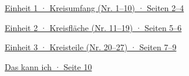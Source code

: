 \documentclass[11pt]{article}
\newcommand{\vzeile}[2]{\par\noindent\hyperlink{#1}{#2}\par\medskip}
\begin{document}
\weit
{}
\vzeile{e1}{Einheit 1 · Kreisumfang (Nr. 1–10) · Seiten 2–4}
\vzeile{e2}{Einheit 2 · Kreisfläche (Nr. 11–19) · Seiten 5–6}
\vzeile{e3}{Einheit 3 · Kreisteile (Nr. 20–27) · Seiten 7–9}
\vzeile{abhaken}{Das kann ich · Seite 10}
\clearpage

\clearpage

\clearpage

\clearpage

\end{document}
